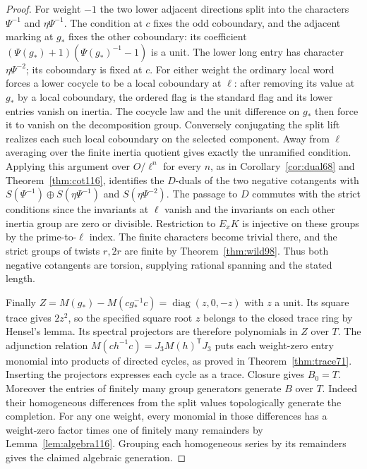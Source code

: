 \documentclass[a4paper,11pt]{article}
\theoremstyle{definition}
\theoremstyle{remark}
\numberwithin{equation}{section}
\begin{document}
\begin{proof}
For weight \(-1\) the two lower adjacent directions split
into the characters \(\Psi^{-1}\) and \(\eta\Psi^{-1}\).
The condition at \(c\) fixes the odd coboundary, and the
adjacent marking at \(g_*\) fixes the other coboundary:
its coefficient \((\Psi(g_*)+1)(\Psi(g_*)^{-1}-1)\) is
a unit. The lower long entry has character \(\eta\Psi^{-2}\);
its coboundary is fixed at \(c\). For either weight the
ordinary local word forces a lower cocycle to be a local
coboundary at \(\ell\): after removing its value at \(g_*\)
by a local coboundary, the ordered flag is the standard flag
and its lower entries vanish on inertia. The cocycle law and
the unit difference on \(g_*\) then force it to vanish on the
decomposition group. Conversely conjugating the split lift
realizes each such local coboundary on the selected component.
Away from \(\ell\) averaging over the finite inertia quotient
gives exactly the unramified condition. Applying this argument
over \(O/\ell^n\) for every \(n\), as in
Corollary~\ref{cor:dual68} and Theorem~\ref{thm:cot116},
identifies the \(D\)-duals of the two negative cotangents with
\(S(\Psi^{-1})\oplus S(\eta\Psi^{-1})\) and \(S(\eta\Psi^{-2})\).
The passage to \(D\) commutes with the strict conditions since
the invariants at \(\ell\) vanish and the invariants on each
other inertia group are zero or divisible. Restriction to
\(E_xK\) is injective on these groups by the prime-to-\(\ell\)
index. The finite characters become trivial there, and the
strict groups of twists \(r,2r\) are finite by
Theorem~\ref{thm:wild98}. Thus both negative cotangents are
torsion, supplying rational spanning and the stated length.

Finally \(Z=M(g_*)-M(cg_*^{-1}c)=\operatorname{diag}(z,0,-z)\)
with \(z\) a unit. Its square trace gives \(2z^2\), so the
specified square root \(z\) belongs to the closed trace ring
by Hensel's lemma. Its spectral projectors are therefore
polynomials in \(Z\) over \(T\). The adjunction relation
\(M(ch^{-1}c)=J_3 M(h)^{\mathsf T}J_3\) puts each
weight-zero entry monomial into products of directed cycles,
as proved in Theorem~\ref{thm:trace71}. Inserting the projectors
expresses each cycle as a trace. Closure gives \(B_0=T\).
Moreover the entries of finitely many group generators generate
\(B\) over \(T\). Indeed their homogeneous differences from
the split values topologically generate the completion. For
any one weight, every monomial in those differences has a
weight-zero factor times one of finitely many remainders by
Lemma~\ref{lem:algebra116}. Grouping each homogeneous series
by its remainders gives the claimed algebraic generation.
\end{proof}
\end{document}
